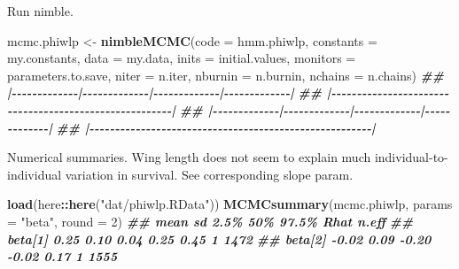\documentclass[
  12pt,
]{krantz}
\newenvironment{Shaded}{\begin{snugshade}}{\end{snugshade}}
\newcommand{\AttributeTok}[1]{\textcolor[rgb]{0.13,0.29,0.53}{#1}}
\newcommand{\DecValTok}[1]{\textcolor[rgb]{0.00,0.00,0.81}{#1}}
\newcommand{\DocumentationTok}[1]{\textcolor[rgb]{0.56,0.35,0.01}{\textbf{\textit{#1}}}}
\newcommand{\FunctionTok}[1]{\textcolor[rgb]{0.13,0.29,0.53}{\textbf{#1}}}
\newcommand{\NormalTok}[1]{#1}
\newcommand{\OtherTok}[1]{\textcolor[rgb]{0.56,0.35,0.01}{#1}}
\newcommand{\SpecialCharTok}[1]{\textcolor[rgb]{0.81,0.36,0.00}{\textbf{#1}}}
\newcommand{\StringTok}[1]{\textcolor[rgb]{0.31,0.60,0.02}{#1}}
\begin{document}
Run nimble.

\begin{Shaded}
\begin{Highlighting}[]
\NormalTok{mcmc.phiwlp }\OtherTok{\textless{}{-}} \FunctionTok{nimbleMCMC}\NormalTok{(}\AttributeTok{code =}\NormalTok{ hmm.phiwlp, }
                          \AttributeTok{constants =}\NormalTok{ my.constants,}
                          \AttributeTok{data =}\NormalTok{ my.data,              }
                          \AttributeTok{inits =}\NormalTok{ initial.values,}
                          \AttributeTok{monitors =}\NormalTok{ parameters.to.save,}
                          \AttributeTok{niter =}\NormalTok{ n.iter,}
                          \AttributeTok{nburnin =}\NormalTok{ n.burnin, }
                          \AttributeTok{nchains =}\NormalTok{ n.chains)}
\DocumentationTok{\#\# |{-}{-}{-}{-}{-}{-}{-}{-}{-}{-}{-}{-}{-}|{-}{-}{-}{-}{-}{-}{-}{-}{-}{-}{-}{-}{-}|{-}{-}{-}{-}{-}{-}{-}{-}{-}{-}{-}{-}{-}|{-}{-}{-}{-}{-}{-}{-}{-}{-}{-}{-}{-}{-}|}
\DocumentationTok{\#\# |{-}{-}{-}{-}{-}{-}{-}{-}{-}{-}{-}{-}{-}{-}{-}{-}{-}{-}{-}{-}{-}{-}{-}{-}{-}{-}{-}{-}{-}{-}{-}{-}{-}{-}{-}{-}{-}{-}{-}{-}{-}{-}{-}{-}{-}{-}{-}{-}{-}{-}{-}{-}{-}{-}{-}|}
\DocumentationTok{\#\# |{-}{-}{-}{-}{-}{-}{-}{-}{-}{-}{-}{-}{-}|{-}{-}{-}{-}{-}{-}{-}{-}{-}{-}{-}{-}{-}|{-}{-}{-}{-}{-}{-}{-}{-}{-}{-}{-}{-}{-}|{-}{-}{-}{-}{-}{-}{-}{-}{-}{-}{-}{-}{-}|}
\DocumentationTok{\#\# |{-}{-}{-}{-}{-}{-}{-}{-}{-}{-}{-}{-}{-}{-}{-}{-}{-}{-}{-}{-}{-}{-}{-}{-}{-}{-}{-}{-}{-}{-}{-}{-}{-}{-}{-}{-}{-}{-}{-}{-}{-}{-}{-}{-}{-}{-}{-}{-}{-}{-}{-}{-}{-}{-}{-}|}
\end{Highlighting}
\end{Shaded}

Numerical summaries. Wing length does not seem to explain much individual-to-individual variation in survival. See corresponding slope param.

\begin{Shaded}
\begin{Highlighting}[]
\FunctionTok{load}\NormalTok{(here}\SpecialCharTok{::}\FunctionTok{here}\NormalTok{(}\StringTok{"dat/phiwlp.RData"}\NormalTok{))}
\FunctionTok{MCMCsummary}\NormalTok{(mcmc.phiwlp, }\AttributeTok{params =} \StringTok{"beta"}\NormalTok{, }\AttributeTok{round =} \DecValTok{2}\NormalTok{)}
\DocumentationTok{\#\#          mean   sd  2.5\%   50\% 97.5\% Rhat n.eff}
\DocumentationTok{\#\# beta[1]  0.25 0.10  0.04  0.25  0.45    1  1472}
\DocumentationTok{\#\# beta[2] {-}0.02 0.09 {-}0.20 {-}0.02  0.17    1  1555}
\end{Highlighting}
\end{Shaded}
\end{document}
